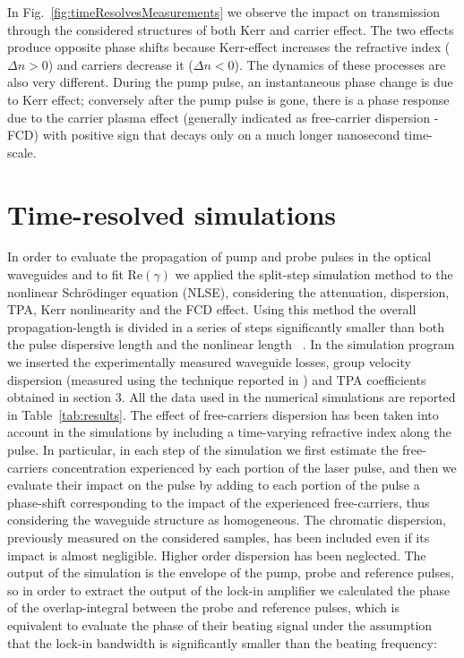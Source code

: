 \documentclass[10pt,letterpaper]{article}
\begin{document}
In Fig.~\ref{fig:timeResolvesMeasurements} we observe the impact on transmission through the considered structures of both Kerr and carrier effect. The two effects produce opposite phase shifts because Kerr-effect increases the refractive index ($\Delta n > 0 $) and carriers decrease it ($ \Delta n < 0 $).  The dynamics  of these processes are also very different. During the pump pulse, an instantaneous phase change is due to Kerr effect; conversely after the pump pulse is gone, there is a phase response due to the carrier plasma effect (generally indicated as free-carrier dispersion - FCD) with positive sign that decays only on a much longer nanosecond time-scale.


\section{Time-resolved simulations}
In order to evaluate the propagation of pump and probe pulses in the optical waveguides and to fit Re$(\gamma)$ we applied the split-step simulation method to the nonlinear Schr\"{o}dinger equation (NLSE), considering the attenuation, dispersion, TPA, Kerr nonlinearity and the FCD effect. Using this method the overall propagation-length is divided in a series of steps significantly smaller than both the pulse dispersive length and the nonlinear length ~\cite{Agrawal2001a,Lin2007}. In the simulation program we inserted the experimentally measured waveguide losses, group velocity dispersion (measured using the technique reported in \cite{Mas2012}) and TPA coefficients obtained in section 3. All the data used in the numerical simulations are reported in Table~\ref{tab:results}. The effect of free-carriers dispersion has been taken into account in the simulations by including a time-varying refractive index along the pulse. In particular, in each step of the simulation we first estimate the free-carriers concentration experienced by each portion of the laser pulse, and then we evaluate their impact on the pulse by adding to each portion of the pulse a phase-shift corresponding to the impact of the experienced free-carriers, thus considering the waveguide structure as homogeneous. The chromatic dispersion, previously measured on the considered samples, has been included even if its impact is almost negligible. Higher order dispersion has been neglected. The output of the simulation is the envelope of the pump, probe and reference pulses, so in order to extract the output of the lock-in amplifier we calculated the phase of the overlap-integral between the probe and reference pulses, which is equivalent to evaluate the phase of their beating signal under the assumption that the lock-in bandwidth is significantly smaller than the beating frequency:
\end{document}
